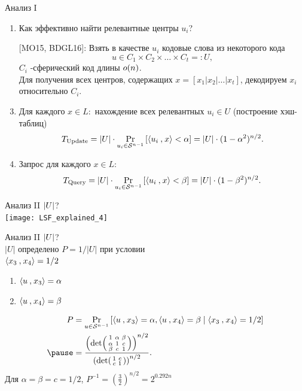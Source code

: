 \documentclass[usenames,dvipsnames, 9pt]{beamer}
\begin{document}
\begin{frame}{Анализ I}
\LARGE
\begin{enumerate}
	\item Как эффективно найти релевантные центры $u_i$?
	\item[][MO15, BDGL16]: Взять в качестве $u_i$ кодовые слова из некоторого кода
	\[
	u \in C_1 \times C_2 \times \ldots \times C_t =:U,
	\]
	$C_i$ -сферический код длины $o(n)$.\\[10pt]
	
	Для получения всех центров, содержащих $x = [x_1 | x_2 | \ldots | x_t]$, декодируем $x_i$ относительно $C_i$. \\[10pt] 
	\pause
	\item Для каждого $x \in L:$ нахождение всех релевантных $u_i \in U$ (построение хэш-таблиц)
	\[
	T_{\text{Update}} = |U| \cdot \Pr_{u_i \in \mathcal{S}^{n-1}}\left[ \langle u_i\mathbin{,}x\rangle < \alpha \right] = |U|\cdot(1-\alpha^2)^{n/2}.
	\]
	\pause
	\item Запрос для каждого $x \in L$: 
	\[
	T_{\text{Query}} = |U| \cdot \Pr_{u_i \in \mathcal{S}^{n-1}}\left[ \langle u_i\mathbin{,}x\rangle < \beta \right] = |U|\cdot(1-\beta^2)^{n/2}.
	\]
	
\end{enumerate}
\end{frame}

\begin{frame}{Анализ II}
\Large
\centering
$\left\lvert U\right\rvert$?\\

\texttt{[image: LSF\_explained\_4]}
\end{frame}

\begin{frame}{Анализ II}
\Large
\centering
 $\left\lvert U\right\rvert$?\\[10pt]

$|U|$ определено $P = 1/|U|$ при условии \\ $\langle x_3\mathbin{,}x_4\rangle  = 1/2$
\begin{enumerate}
\item $\langle u\mathbin{,}x_3\rangle  = \alpha$
\item $\langle u\mathbin{,}x_4\rangle  = \beta$
\end{enumerate}
\begin{align*}
P &= \Pr_{u \in \mathcal{S}^{n-1}} \left[  \ScProd{u}{x_3}  = \alpha, \ScProd{u}{x_4}  = \beta \; |  \; \ScProd{x_3}{x_4}  = 1/2\right]  \\ \pause
&= \frac{
\left(\det\begin{psmallmatrix}
1 & \alpha & \beta \\
\alpha & 1 & c\\
\beta & c & 1
\end{psmallmatrix}
\right)^{n/2}
}
{
\left(\det\begin{psmallmatrix}
1 & c \\
c & 1
\end{psmallmatrix}\right)^{n/2}
}.
\end{align*}
\pause
Для $\alpha=\beta = c = 1/2$, $P^{-1} = \left(\frac{3}{2}\right)^{n/2} = 2^{0.292n}$ 


\end{frame}
\end{document}
